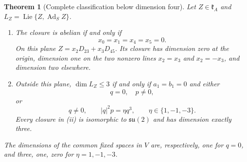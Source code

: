 \documentclass[11pt,a4paper]{article}
\newtheorem{theorem}{Theorem}[section]
\newcommand{\Lie}{\operatorname{Lie}}
\newcommand{\Ad}{\operatorname{Ad}}
\begin{document}
\begin{theorem}[Complete classification below dimension four]
\label{thm:low-complete}
Let $Z\in\mathfrak k_A$ and $L_Z=\Lie\{Z,\Ad_SZ\}$.
\begin{enumerate}[label=\textnormal{(\roman*)},leftmargin=9mm]
\item The closure is abelian if and only if
\[
 x_0=x_1=x_4=x_5=0.
\]
On this plane $Z=x_2D_{23}+x_3D_{45}$.  Its closure has dimension zero at the origin, dimension one on the two nonzero lines $x_2=x_3$ and $x_2=-x_3$, and dimension two elsewhere.
\item Outside this plane, $\dim L_Z\le3$ if and only if $a_1=b_1=0$ and either
\[
 q=0,\quad p\ne0,
\]
or
\begin{equation}
 q\ne0,\qquad |q|^2p=\eta q^3,
 \qquad \eta\in\{1,-1,-3\}.
 \label{eq:three-small-families}
\end{equation}
Every closure in (ii) is isomorphic to $\mathfrak{su}(2)$ and has dimension exactly three.
\end{enumerate}
The dimensions of the common fixed spaces in $V$ are, respectively, one for $q=0$, and three, one, zero for $\eta=1,-1,-3$.
\end{theorem}
\end{document}
